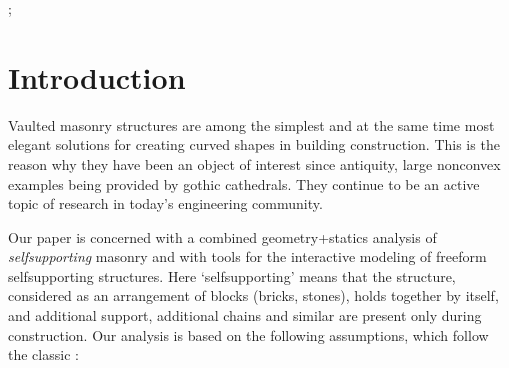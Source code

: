\documentclass[annual]{acmsiggraph}
\newcommand{\todo}[1]{\textcolor{red}{#1}}
\begin{document}

\begin{CRcatlist}
  ;
\end{CRcatlist}


\keywordlist


\TOGlinkslist


\copyrightspace


\section{Introduction}



Vaulted masonry structures are among the simplest and at the same time
most elegant solutions for creating curved shapes in building
construction. This is the reason why they have been an object of interest
since antiquity, large non\dash convex examples being provided by gothic
cathedrals. They continue to be an active topic of research in today's
engineering community.


Our paper is concerned with a combined geometry+statics analysis of {\em
self\dash supporting} masonry and with tools for the interactive modeling
of freeform self\dash supporting structures. Here `self\dash supporting'
means that the structure, considered as an arrangement of blocks (bricks,
stones), holds together by itself, and additional support, additional
chains and similar are present only during construction. Our analysis is
based on the following assumptions, which follow the classic
\cite{Heyman66}:
\end{document}
